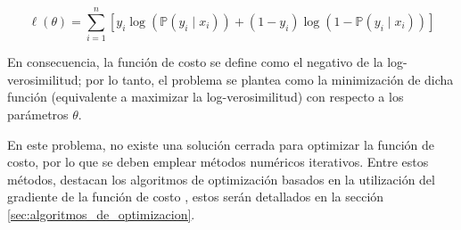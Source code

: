 \begin{equation}
    \label{eq:log_likelihood}
      \ell(\theta) = \sum_{i=1}^{n} \left[ y_i \log(\mathbb{P}(y_i \mid x_i)) + (1 - y_i) \log(1 - \mathbb{P}(y_i \mid x_i)) \right]
\end{equation}

En consecuencia, la función de costo se define como el negativo de la log-ve\-ro\-si\-mi\-li\-tud; por lo tanto, el problema se plantea como la minimización de dicha función (equivalente a maximizar la log-ve\-ro\-si\-mi\-li\-tud) con respecto a los parámetros $\theta$.

En este problema, no existe una solución cerrada para optimizar la función de costo, por lo que se deben emplear métodos numéricos iterativos. Entre estos métodos, destacan los algoritmos de optimización basados en la utilización del gradiente de la función de costo \cite{Nocedal2006}, estos serán detallados en la sección \ref{sec:algoritmos_de_optimizacion}.





